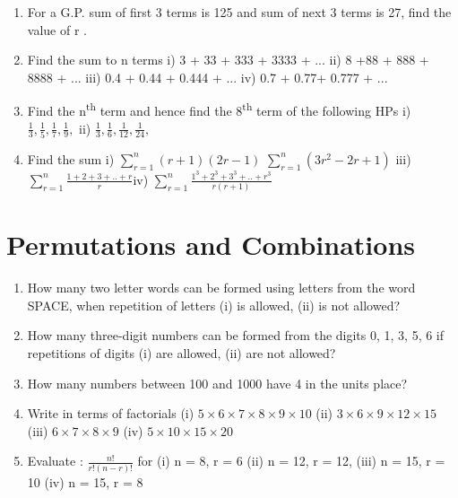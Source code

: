 \documentclass[14pt]{article}
\begin{document}
\begin{multicols}{2}
\begin{enumerate}[resume]
\item For a G.P. sum of first 3 terms is 125
and sum of next 3 terms is 27,
find the value of  r .

\item Find the sum to n terms i) 3 + 33 + 333 + 3333 + ...  ii) 8 +88 + 888 + 8888 + ... iii) 0.4 + 0.44 + 0.444 + ... iv) 0.7 + 0.77+ 0.777 + ...

\item Find the n\textsuperscript{th} term and hence find the 8\textsuperscript{th} term
of the following HPs i) $\frac{1}{3},\frac{1}{5},\frac{1}{7},\frac{1}{9},$ ii) $\frac{1}{3},\frac{1}{6},\frac{1}{12},\frac{1}{24},$  

\item Find the sum i) $\sum\limits_{r=1}^n (r+1)(2r-1)$
$\sum\limits_{r=1}^n (3r^2-2r+1)$ iii) $\sum\limits_{r=1}^n \frac{1+2+3+..+r}{r}$\quad iv) $\sum\limits_{r=1}^n \frac{1^3+2^3+3^3+..+r^3}{r(r+1)}$

\end{enumerate} 










\section{Permutations and Combinations}
\noindent
\begin{enumerate}[resume]
  
\item How many two letter words can be formed
using letters from the word SPACE, when
repetition of letters (i) is allowed, (ii) is not
allowed?
\item How many three-digit numbers can be
formed from the digits 0, 1, 3, 5, 6 if
repetitions of digits (i) are allowed, (ii) are
not allowed?
\item How many numbers between 100 and 1000
have 4 in the units place?
		 
\item Write in terms of factorials
(i)	$5 \times 6 \times 7 \times 8 \times 9 \times 10	$
(ii)	$3 \times 6 \times 9 \times 12 \times 15$
(iii)	$6 \times 7 \times 8 \times 9$
(iv)  $5 \times 10 \times 15 \times 20$

\item 
Evaluate : $\frac{n!}{r!(n-r)!}$ for  (i)	 n = 8, r = 6	 (ii)	 n = 12, r = 12,
	 (iii)	 n = 15, r = 10	 (iv)	 n = 15, r = 8
	 

\end{enumerate}
\end{multicols}
\end{document}
